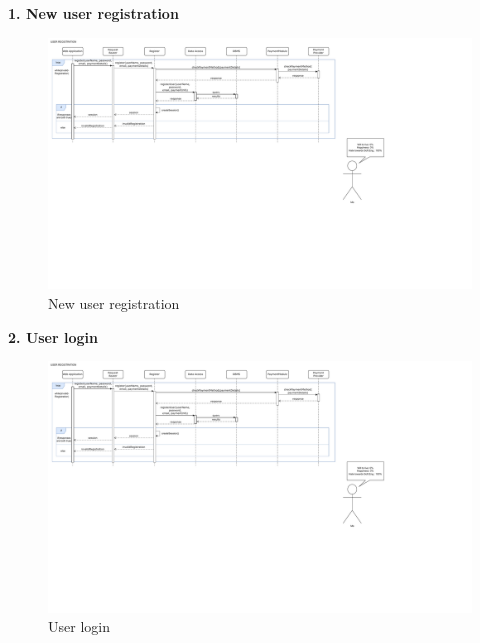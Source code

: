 \documentclass[11pt]{article}
\begin{document}
\begin{description}
    \item \textbf{1. New user registration}
    \begin{figure}[!ht]
        \centering
        \includegraphics[page={1}, trim=0cm 18cm 16cm 1cm, width=\linewidth, clip]{RuntimeDiagrams.pdf}
        \caption{New user registration}
    \end{figure}
    
    \item \textbf{2. User login}
    \begin{figure}[!ht]
        \centering
        \includegraphics[page={2}, trim=0cm 20cm 25cm 1cmm, width=\linewidth, clip]{RuntimeDiagrams.pdf}
        \caption{User login}
    \end{figure}
    
    \newpage
    

\end{description}
\end{document}
